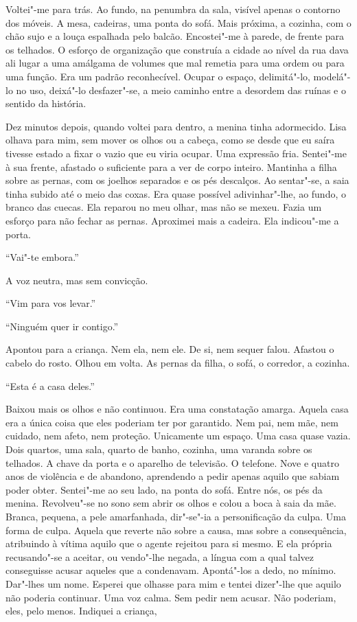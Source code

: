 Voltei"-me para trás. Ao fundo, na penumbra da sala, visível apenas o
contorno dos móveis. A mesa, cadeiras, uma ponta do sofá. Mais próxima,
a cozinha, com o chão sujo e a louça espalhada pelo balcão. Encostei"-me
à parede, de frente para os telhados. O esforço de organização que
construía a cidade ao nível da rua dava ali lugar a uma amálgama de
volumes que mal remetia para uma ordem ou para uma função. Era um padrão
reconhecível. Ocupar o espaço, delimitá"-lo, modelá"-lo no uso,
deixá"-lo desfazer"-se, a meio caminho entre a desordem das ruínas e o
sentido da história.

Dez minutos depois, quando voltei para dentro, a menina tinha
adormecido. Lisa olhava para mim, sem mover os olhos ou a cabeça, como
se desde que eu saíra tivesse estado a fixar o vazio que eu viria
ocupar. Uma expressão fria. Sentei"-me à sua frente, afastado o
suficiente para a ver de corpo inteiro. Mantinha a filha sobre as
pernas, com os joelhos separados e os pés descalços. Ao sentar"-se, a
saia tinha subido até o meio das coxas. Era quase possível
adivinhar"-lhe, ao fundo, o branco das cuecas. Ela reparou no meu olhar,
mas não se mexeu. Fazia um esforço para não fechar as pernas. Aproximei
mais a cadeira. Ela indicou"-me a porta.

``Vai"-te embora.''

A voz neutra, mas sem convicção.

``Vim para vos levar.''

``Ninguém quer ir contigo.''

Apontou para a criança. Nem ela, nem ele. De si, nem sequer falou.
Afastou o cabelo do rosto. Olhou em volta. As pernas da filha, o sofá, o
corredor, a cozinha.

``Esta é a casa deles.''

Baixou mais os olhos e não continuou. Era uma constatação amarga. Aquela
casa era a única coisa que eles poderiam ter por garantido. Nem pai, nem
mãe, nem cuidado, nem afeto, nem proteção. Unicamente um espaço. Uma
casa quase vazia. Dois quartos, uma sala, quarto de banho, cozinha, uma
varanda sobre os telhados. A chave da porta e o aparelho de televisão. O
telefone. Nove e quatro anos de violência e de abandono, aprendendo a
pedir apenas aquilo que sabiam poder obter. Sentei"-me ao seu lado, na
ponta do sofá. Entre nós, os pés da menina. Revolveu"-se no sono sem
abrir os olhos e colou a boca à saia da mãe. Branca, pequena, a pele
amarfanhada, dir"-se"-ia a personificação da culpa. Uma forma de culpa.
Aquela que reverte não sobre a causa, mas sobre a consequência,
atribuindo à vítima aquilo que o agente rejeitou para si mesmo. E ela
própria recusando"-se a aceitar, ou vendo"-lhe negada, a língua com a
qual talvez conseguisse acusar aqueles que a condenavam. Apontá"-los a
dedo, no mínimo. Dar"-lhes um nome. Esperei que olhasse para mim e
tentei dizer"-lhe que aquilo não poderia continuar. Uma voz calma. Sem
pedir nem acusar. Não poderiam, eles, pelo menos. Indiquei a criança,

